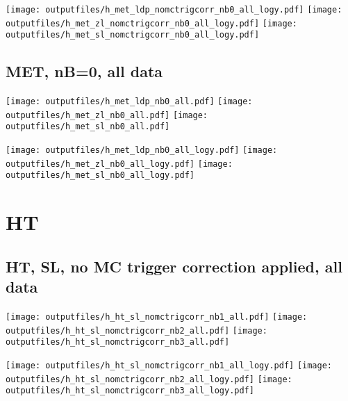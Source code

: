 \documentclass[11pt]{article}
\begin{document}
    \noindent
    \texttt{[image: outputfiles/h\_met\_ldp\_nomctrigcorr\_nb0\_all\_logy.pdf]}
    \texttt{[image: outputfiles/h\_met\_zl\_nomctrigcorr\_nb0\_all\_logy.pdf]}
    \texttt{[image: outputfiles/h\_met\_sl\_nomctrigcorr\_nb0\_all\_logy.pdf]}


    \subsection{ MET, nB=0, all data}

    \noindent
    \texttt{[image: outputfiles/h\_met\_ldp\_nb0\_all.pdf]}
    \texttt{[image: outputfiles/h\_met\_zl\_nb0\_all.pdf]}
    \texttt{[image: outputfiles/h\_met\_sl\_nb0\_all.pdf]}

    \noindent
    \texttt{[image: outputfiles/h\_met\_ldp\_nb0\_all\_logy.pdf]}
    \texttt{[image: outputfiles/h\_met\_zl\_nb0\_all\_logy.pdf]}
    \texttt{[image: outputfiles/h\_met\_sl\_nb0\_all\_logy.pdf]}









   \section{HT}
     \subsection{ HT, SL, no MC trigger correction applied, all data}

    \noindent
     \texttt{[image: outputfiles/h\_ht\_sl\_nomctrigcorr\_nb1\_all.pdf]}
     \texttt{[image: outputfiles/h\_ht\_sl\_nomctrigcorr\_nb2\_all.pdf]}
     \texttt{[image: outputfiles/h\_ht\_sl\_nomctrigcorr\_nb3\_all.pdf]}

    \noindent
     \texttt{[image: outputfiles/h\_ht\_sl\_nomctrigcorr\_nb1\_all\_logy.pdf]}
     \texttt{[image: outputfiles/h\_ht\_sl\_nomctrigcorr\_nb2\_all\_logy.pdf]}
     \texttt{[image: outputfiles/h\_ht\_sl\_nomctrigcorr\_nb3\_all\_logy.pdf]}
\end{document}
